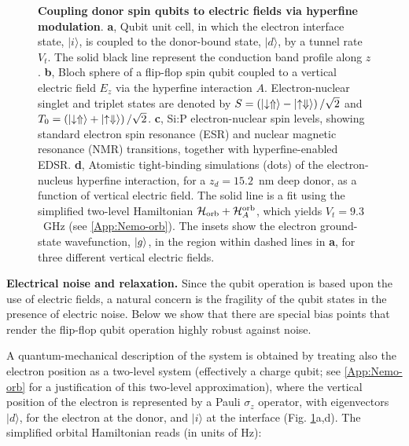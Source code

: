 \documentclass[aps,prb,superscriptaddress,nobibnotes,twocolumn]{revtex4-1}
\begin{document}
\begin{figure}
\centering
\caption{\textbf{Coupling donor spin qubits to electric fields via hyperfine modulation}. \textbf{a}, Qubit unit cell, in which the electron interface state, $|i\rangle$, is coupled to the donor-bound state, $|d\rangle$, by a tunnel rate $V_t$. The solid black line represent the conduction band profile along $z$. \textbf{b}, Bloch sphere of a flip-flop spin qubit coupled to a vertical electric field $E_z$ via the hyperfine interaction $A$. Electron-nuclear singlet and triplet states are denoted by $S=\left(\ket{\downarrow\Uparrow}-\ket{\uparrow\Downarrow}\right)/\sqrt{2}$ and $T_0=\left(\ket{\downarrow\Uparrow}+\ket{\uparrow\Downarrow}\right)/\sqrt{2}$. \textbf{c}, Si:P electron-nuclear spin levels, showing standard electron spin resonance (ESR) and nuclear magnetic resonance (NMR) transitions, together with hyperfine-enabled EDSR. \textbf{d}, Atomistic tight-binding simulations \cite{Klimeck2007} (dots) of the electron-nucleus hyperfine interaction, for a $z_d=15.2$~nm deep donor, as a function of vertical electric field. The solid line is a fit using the simplified two-level Hamiltonian $\mathcal{H}_{\rm orb}+\mathcal{H}_A^{\rm orb}$, which yields $V_t=9.3$~GHz (see \ref{App:Nemo-orb}). The insets show the electron ground-state wavefunction, $\ket{g}$, in the region within dashed lines in \textbf{a}, for three different vertical electric fields.}
\label{fig:A(E)}
\end{figure}


\vspace{3mm}
\noindent\textbf{Electrical noise and relaxation.}
%
Since the qubit operation is based upon the use of electric fields, a natural concern is the fragility of the qubit states in the presence of electric noise. Below we show that there are special bias points that render the flip-flop qubit operation highly robust against noise.

A quantum-mechanical description of the system is obtained by treating also the electron position as a two-level system (effectively a charge qubit; see \ref{App:Nemo-orb} for a justification of this two-level approximation), where the vertical position of the electron is represented by a Pauli $\sigma_z$ operator, with eigenvectors $|d\rangle$, for the electron at the donor, and $|i\rangle$ at the interface (Fig. \ref{fig:A(E)}a,d). The simplified orbital Hamiltonian reads (in units of Hz):
\end{document}
